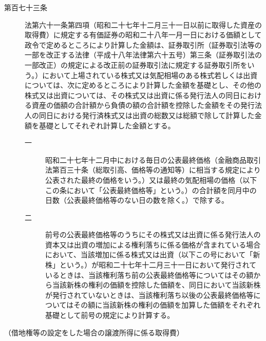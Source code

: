 \documentclass[twocolumn,a4j,10pt]{ltjtarticle}
\begin{document}
\begin{description}
\item[第百七十三条]法第六十一条第四項（昭和二十七年十二月三十一日以前に取得した資産の取得費）に規定する有価証券の昭和二十八年一月一日における価額として政令で定めるところにより計算した金額は、証券取引所（証券取引法等の一部を改正する法律（平成十八年法律第六十五号）第三条（証券取引法の一部改正）の規定による改正前の証券取引法に規定する証券取引所をいう。）において上場されている株式又は気配相場のある株式若しくは出資については、次に定めるところにより計算した金額を基礎とし、その他の株式又は出資については、その株式又は出資に係る発行法人の同日における資産の価額の合計額から負債の額の合計額を控除した金額をその発行法人の同日における発行済株式又は出資の総数又は総額で除して計算した金額を基礎としてそれぞれ計算した金額とする。
\begin{description}
\item[一]昭和二十七年十二月中における毎日の公表最終価格（金融商品取引法第百三十条（総取引高、価格等の通知等）に相当する規定により公表された最終の価格をいう。）又は最終の気配相場の価格（以下この条において「公表最終価格等」という。）の合計額を同月中の日数（公表最終価格等のない日の数を除く。）で除する。
\item[二]前号の公表最終価格等のうちにその株式又は出資に係る発行法人の資本又は出資の増加による権利落ちに係る価格が含まれている場合において、当該増加に係る株式又は出資（以下この号において「新株」という。）が昭和二十七年十二月三十一日において発行されているときは、当該権利落ち前の公表最終価格等についてはその額から当該新株の権利の価額を控除した価額を、同日において当該新株が発行されていないときは、当該権利落ち以後の公表最終価格等についてはその額に当該新株の権利の価額を加算した価額をそれぞれ基礎として前号の規定により計算する。
\end{description}
\end{description}
\noindent\hspace{10pt}（借地権等の設定をした場合の譲渡所得に係る取得費）
\end{document}
